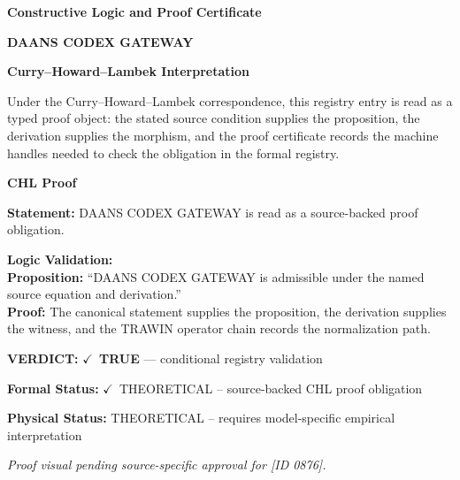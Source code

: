 \clearpage
\begingroup\tzpsupportsetup
\noindent\textbf{\fontsize{10.8pt}{12.8pt}\selectfont [ID 0876] Constructive Logic and Proof Certificate}\par
\noindent\textbf{\fontsize{10pt}{12pt}\selectfont DAANS CODEX GATEWAY}\par
\vspace{0.45em}
\begingroup
\footnotesize
\setlength{\parskip}{0.22em}
\setlength{\parindent}{0pt}
\noindent\textbf{Curry--Howard--Lambek Interpretation}\par
Under the Curry--Howard--Lambek correspondence, this registry entry is read as a typed proof
object: the stated source condition supplies the proposition, the derivation supplies the
morphism, and the proof certificate records the machine handles needed to check the obligation
in the formal registry.

\vspace{0.45em}
\noindent\textbf{CHL Proof}\par
\textbf{Statement:} DAANS CODEX GATEWAY is read as a source-backed proof obligation.

\textbf{Logic Validation:}\\
\textbf{Proposition:} ``DAANS CODEX GATEWAY is admissible under the named source equation and derivation.''\\
\textbf{Proof:} The canonical statement supplies the proposition, the derivation supplies the witness, and the TRAWIN operator chain records the normalization path.

\textbf{VERDICT:} \ensuremath{\checkmark}\ \textbf{TRUE} --- conditional registry validation

\textbf{Formal Status:} \ensuremath{\checkmark}\ THEORETICAL -- source-backed CHL proof obligation

\textbf{Physical Status:} THEORETICAL -- requires model-specific empirical interpretation
\par\vspace{0.45em}
\par
\vfill
\begingroup\footnotesize\itshape
Proof visual pending source-specific approval for [ID 0876].
\par\endgroup
\vfill
\endgroup
\endgroup
